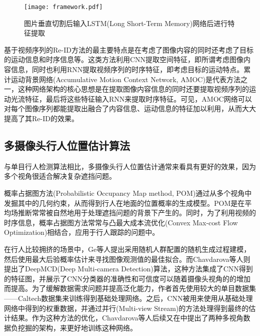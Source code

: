 \begin{figure}
  \centering
  \texttt{[image: framework.pdf]}
  \caption{图片垂直切割后输入LSTM(Long Short-Term Memory)网络后进行特征提取\cite{varior2016siamese}}
  \label{fig:part}
\end{figure}

基于视频序列的Re-ID方法的最主要特点是在考虑了图像内容的同时还考虑了目标的运动信息和时序信息等。这类方法利用CNN提取空间特征，即所谓考虑图像内容信息，同时也利用RNN提取视频序列的时序特征，即考虑目标的运动特点。累计运动背景网络(Accumulative Motion Context Network, AMOC)\cite{liu2017video}是代表方法之一，这种网络架构的核心思想是在提取图像内容信息的同时还要提取视频序列的运动光流特征，最后将这些特征输入RNN来提取时序特征。可见，AMOC网络可以对每个图像序列都能提取出融合了内容信息、运动信息的特征加以利用，从而大大提高了其Re-ID的效果。



\subsection{多摄像头行人位置估计算法}

与单目行人检测算法相比，多摄像头行人位置估计通常来看具有更好的效果，因为多个视角很适合解决复杂遮挡问题\cite{baque2017deep}。

概率占据图方法(Probabilistic Occupancy Map method, POM)\cite{fleuret2007multicamera}通过从多个视角中发掘其中的几何约束，从而得到行人在地面的位置概率的生成模型。POM是在平均场推断常常被自然地用于处理遮挡问题的背景下产生的。同时，为了利用视频的时序信息，概率占据图方法常常与凸最大成本流优化(Convex Max-cost Flow Optimization)\cite{berclaz2009multiple}相结合，应用于行人跟踪的问题中。

在行人比较拥挤的场景中，Ge\cite{ge2010crowd}等人提出采用随机人群配置的随机生成过程建模，然后使用最大后验概率估计来寻找图像观测值的最佳拟合。而Chavdarova\cite{chavdarova2017deep}等人则提出了DeepMCD(Deep Multi-camera Detection)算法，这种方法集成了CNN得到的特征图，并展示了CNN分类器的准确性和可信度可以随着摄像头视角的的增加而提高。为了缓解数据需求问题并提高泛化能力，作者首先使用较大的单目数据集——Caltech数据集\cite{dollar2009pedestrian}来训练得到基础处理网络。之后，CNN被用来使用从基础处理网络中得到的权重数据，并通过并行(Multi-view Stream)的方法处理得到最终的估计结果。作为这种方法的优化，Chavdarova等人后续又在\cite{chavdarova2017deep}中提出了两种多视角数据负挖掘的架构，来更好地训练这种网络。

